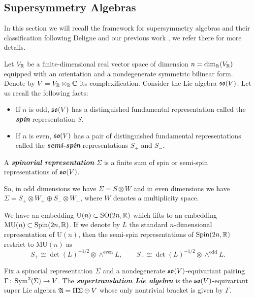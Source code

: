 \documentclass[10pt, oneside]{article}
\newcommand{\MU}{\mathrm{MU}}
\renewcommand{\U}{\mathrm{U}}
\newcommand{\defterm}[1]{\textbf{\emph{#1}}}
\begin{document}
\subsection{Supersymmetry Algebras} \label{sect:susyalgebras}
In this section we will recall the framework for supersymmetry algebras and their classification following Deligne \cite{DeligneSpinors} and our previous work \cite{ElliottSafronov}, we refer there for more details.

Let $V_\mathbb R$ be a finite-dimensional real vector space of dimension $n=\dim_\mathbb R(V_\mathbb R)$ equipped with an orientation and a nondegenerate symmetric bilinear form. Denote by $V=V_\mathbb R\otimes_\mathbb R\mathbb C$ its complexification. Consider the Lie algebra $\mathfrak{so}(V)$. Let us recall the following facts:
\begin{itemize}
\item If $n$ is odd, $\mathfrak{so}(V)$ has a distinguished fundamental representation called the \defterm{spin} representation $S$.

\item If $n$ is even, $\mathfrak{so}(V)$ has a pair of distinguished fundamental representations called the \defterm{semi-spin} representations $S_+$ and $S_-$.
\end{itemize}

\begin{definition}
A \defterm{spinorial representation} $\Sigma$ is a finite sum of spin or semi-spin representations of $\mathfrak{so}(V)$.
\end{definition}

So, in odd dimensions we have $\Sigma=S\otimes W$ and in even dimensions we have $\Sigma=S_+\otimes W_+\oplus S_-\otimes W_-$, where $W$ denotes a multiplicity space.

We have an embedding $\U(n)\subset \SO(2n, \RR)$ which lifts to an embedding $\MU(n)\subset \Spin(2n, \RR)$. If we denote by $L$ the standard $n$-dimensional representation of $\U(n)$, then the semi-spin representations of $\mathrm{Spin}(2n, \mathbb R)$ restrict to $\MU(n)$ as
\[S_+\cong \det(L)^{-1/2}\otimes \wedge^{\mathrm{even}} L,\qquad S_-\cong \det(L)^{-1/2}\otimes \wedge^{\mathrm{odd}} L.\]

\begin{definition}
Fix a spinorial representation $\Sigma$ and a nondegenerate $\mathfrak{so}(V)$-equivariant pairing $\Gamma\colon \operatorname{Sym}^2(\Sigma)\rightarrow V$. The \defterm{supertranslation Lie algebra} is the $\mathfrak{so}(V)$-equivariant super Lie algebra $\mathfrak A = \Pi\Sigma\oplus V$ whose only nontrivial bracket is given by $\Gamma$.
\end{definition}
\end{document}
